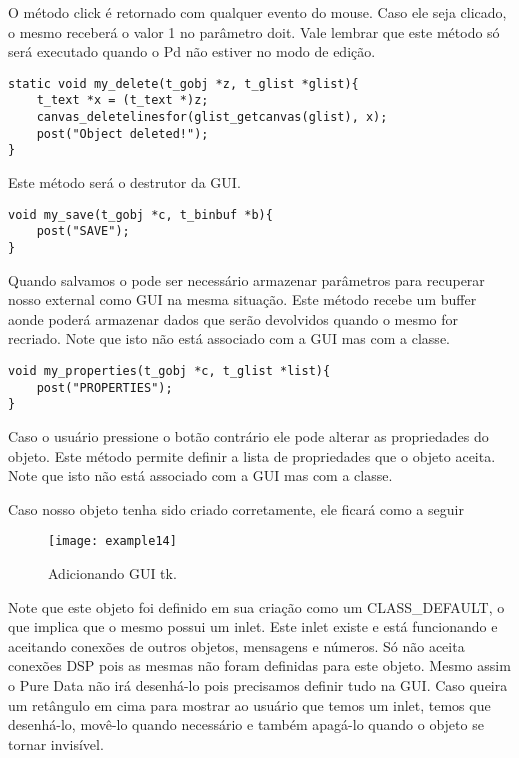 O método click é retornado com qualquer evento do mouse. Caso ele seja clicado, o mesmo receberá o valor 1 no parâmetro doit.
Vale lembrar que este método só será executado quando o Pd não estiver no modo de edição.

\begin{lstlisting}
static void my_delete(t_gobj *z, t_glist *glist){
	t_text *x = (t_text *)z;
	canvas_deletelinesfor(glist_getcanvas(glist), x);
	post("Object deleted!");
} 
\end{lstlisting}

Este método será o destrutor da GUI.

\begin{lstlisting}
void my_save(t_gobj *c, t_binbuf *b){
	post("SAVE");
}
\end{lstlisting}

Quando salvamos o \patch pode ser necessário armazenar parâmetros para recuperar nosso external
como GUI na mesma situação. Este método recebe um buffer aonde poderá armazenar dados que serão
devolvidos quando o mesmo for recriado. Note que isto não está associado com a GUI mas com a classe.



\begin{lstlisting}
void my_properties(t_gobj *c, t_glist *list){
	post("PROPERTIES");
}
\end{lstlisting}

Caso o usuário pressione o botão contrário ele pode alterar as propriedades do objeto. Este método
permite definir a lista de propriedades que o objeto aceita. Note que isto não está associado com a GUI
mas com a classe.


Caso nosso objeto tenha sido criado corretamente, ele ficará como a seguir
\begin{figure}[h!]
	\centering
	\texttt{[image: example14]}
	\caption{Adicionando GUI tk.}
\end{figure}

Note que este objeto foi definido em sua criação como um CLASS\_DEFAULT, o que implica que o mesmo possui
um inlet. Este inlet existe e está funcionando e aceitando conexões de outros objetos, mensagens e números.
Só não aceita conexões DSP pois as mesmas não foram definidas para este objeto. 
Mesmo assim o Pure Data não irá desenhá-lo pois precisamos definir tudo na GUI. Caso queira um
retângulo em cima para mostrar ao usuário que temos um inlet, temos que desenhá-lo, movê-lo quando necessário e 
também apagá-lo quando o objeto se tornar invisível.

